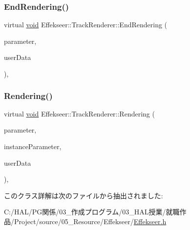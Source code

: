 \mbox{\label{class_effekseer_1_1_track_renderer_ad8ad4cbe8cdbbaacc2106c3e689ce579}} 
\subsubsection{\texorpdfstring{End\+Rendering()}{EndRendering()}}
{\footnotesize\ttfamily virtual \mbox{\hyperlink{namespace_effekseer_ab34c4088e512200cf4c2716f168deb56}{void}} Effekseer\+::\+Track\+Renderer\+::\+End\+Rendering (\begin{DoxyParamCaption}\item[{const \mbox{\hyperlink{struct_effekseer_1_1_track_renderer_1_1_node_parameter}{Node\+Parameter}} \&}]{parameter,  }\item[{\mbox{\hyperlink{namespace_effekseer_ab34c4088e512200cf4c2716f168deb56}{void}} $\ast$}]{user\+Data }\end{DoxyParamCaption})\hspace{0.3cm}{\ttfamily [inline]}, {\ttfamily [virtual]}}

\mbox{\label{class_effekseer_1_1_track_renderer_a5d99f7a58b254166cf938bc739bbb387}} 
\subsubsection{\texorpdfstring{Rendering()}{Rendering()}}
{\footnotesize\ttfamily virtual \mbox{\hyperlink{namespace_effekseer_ab34c4088e512200cf4c2716f168deb56}{void}} Effekseer\+::\+Track\+Renderer\+::\+Rendering (\begin{DoxyParamCaption}\item[{const \mbox{\hyperlink{struct_effekseer_1_1_track_renderer_1_1_node_parameter}{Node\+Parameter}} \&}]{parameter,  }\item[{const \mbox{\hyperlink{struct_effekseer_1_1_track_renderer_1_1_instance_parameter}{Instance\+Parameter}} \&}]{instance\+Parameter,  }\item[{\mbox{\hyperlink{namespace_effekseer_ab34c4088e512200cf4c2716f168deb56}{void}} $\ast$}]{user\+Data }\end{DoxyParamCaption})\hspace{0.3cm}{\ttfamily [inline]}, {\ttfamily [virtual]}}



このクラス詳解は次のファイルから抽出されました\+:\begin{DoxyCompactItemize}
\item 
C\+:/\+H\+A\+L/\+P\+G関係/03\+\_\+作成プログラム/03\+\_\+\+H\+A\+L授業/就職作品/\+Project/source/05\+\_\+\+Resource/\+Effekseer/\mbox{\hyperlink{_effekseer_8h}{Effekseer.\+h}}\end{DoxyCompactItemize}
